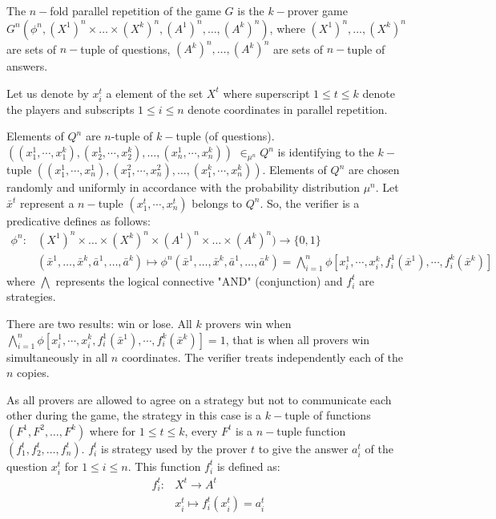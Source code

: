 The $n-$fold parallel repetition of the game $G$ is the $k-$prover game $G^n(\phi^n, (X^1)^n \times \ldots \times (X^k)^n, (A^1)^n, \ldots,( A^k)^n)$, where  $(X^1)^n , \ldots, (X^k)^n$ are sets of $n-$tuple of questions, $(A^k)^n , \ldots, (A^k)^n$ are sets of $n-$tuple of answers. 

Let us denote by $x_i^t$ a element of the set $X^t$ where superscript $1\leq t \leq k$   denote the players and subscripts $1 \leq i \leq n$  denote  coordinates in parallel repetition.

Elements of $Q^n$ are $n$-tuple of $k-$tuple (of questions). $((x_1^1, \cdots , x_1^k), (x_2^1, \cdots , x_2^k),\ldots, (x_n^1, \cdots , x_n^k))$ $ \in_{\mu^n} Q^n$ is identifying to the $k-$tuple $((x_1^1, \cdots , x_n^1), (x_1^2, \cdots , x_n^2),\ldots, (x_1^k, \cdots , x_n^k))$. Elements of $Q^n$ are chosen randomly and uniformly in accordance with the probability distribution $\mu^n$. Let $\bar{x}^t$ represent a $n-$tuple $(x_1^t, \cdots , x_n^t)$ belongs to $Q^n$.
So, the verifier is a predicative defines as follows:
\begin{align*}
\phi^n: &(X^1)^n \times \ldots \times (X^k)^n \times (A^1)^n \times \ldots \times ( A^k)^n)  \longrightarrow  \{0,1\}\\ 
& (\bar{x}^1,\ldots, \bar{x}^k,\bar{a}^1, \ldots, \bar{a}^k)  \longmapsto  \phi^n (\bar{x}^1,\ldots, \bar{x}^k,\bar{a}^1, \ldots, \bar{a}^k) = \bigwedge\limits_{i=1}^n \phi [x_i^1, \cdots , x_i^k, f_i^1(\bar{x}^1), \cdots ,  f_i^k(\bar{x}^k)]
\end{align*}
where $\bigwedge$ represents the logical connective "AND" (conjunction) and $f_i^t$ are strategies.

There are two results: win or lose. All $k$ provers win when $ \bigwedge\limits_{i=1}^n \phi [x_i^1, \cdots , x_i^k, f_i^1(\bar{x}^1), \cdots ,  f_i^k(\bar{x}^k)]=1$, that is when all provers win simultaneously in all $n$ coordinates. The verifier treats independently each of the $n$ copies. 

As  all provers are allowed to agree on a strategy but not to communicate each other during the game, the strategy in this case is a $k-$tuple of functions $(F^1,F^2, \ldots, F^k)$ where for $1\leq t \leq k$, every $F^t$ is a $n-$tuple function $(f_1^t, f_2^t, \ldots, f_n^t)$. $f_i^t$ is strategy used by the prover $t$ to give the answer $a_i^t$ of the question $x_i^t$ for $1\leq i \leq n$. This function $f_i^t$ is defined as:
\begin{align*}
f_i^t: & X^t \longrightarrow A^t \\ & x_i^t \longmapsto f_i^t(x_i^t)=a_i^t
\end{align*}

